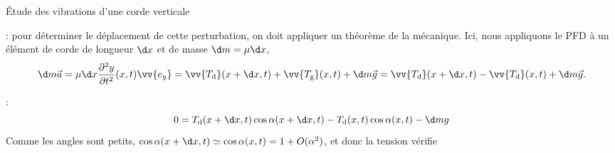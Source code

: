 \begin{exo}[PC][3][TD]{Étude des vibrations d'une corde verticale}
\begin{quest}
{\begin{liste}
  \item {}: pour déterminer le déplacement de cette perturbation, on doit appliquer un théorème de la mécanique. Ici, nous appliquons le PFD à un élément de corde de longueur $\d x$ et de masse $\d m = \mu \d x$,
  \begin{equation*}
    \d m \Vec{a} =  \mu\d x\frac{\partial^2 y}{\partial t^2}(x,t)\vv{e_y} = \vv{T_{\rm{d}}}(x+\d x,t)+\vv{T_{\rm{g}}}(x,t) + \d m \Vec{g} = \vv{T_{\rm{d}}}(x+\d x,t) - \vv{T_{\rm{d}}}(x,t) + \d m \Vec{g}.
  \end{equation*}
 \item {} :%
 \begin{equation*}
 0=T_{\rm{d}}(x+\d x,t)\cos\alpha(x+\d x,t)-T_{\rm{d}}(x,t)\cos\alpha(x,t) - \d m g 
 \end{equation*}
 Comme les angles sont petits, $\cos\alpha(x+\d x,t)\simeq \cos\alpha(x,t) =  1 + O(\alpha^2)$, et donc la tension  vérifie 
 

\end{liste}}
\end{quest}
\end{exo}
